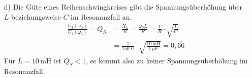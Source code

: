 {\begin{itemize}
    Die zugehörigen Werte sind:\\
    \begin{tabular}{cccccccc}
    \toprule
        $\omega$ & $0$ & $100\,\mathrm{s}^{-1}$ & $2000\,\mathrm{s}^{-1}$ & $3500\,\mathrm{s}^{-1}$ & $\omega_0$ & $10000\,\mathrm{s}^{-1}$ & $\omega\to\infty$\\
    \midrule
        $A(\omega)$ & $1,000$ & $1,009$ & $1,033$ & $1,087$ & $0,943$ & $0,555$ & $0$ \\
    \bottomrule
    \end{tabular}
    \item[d)] Die Güte eines Reihenschwingkreises gibt die Spannungsüberhöhung über $L$ beziehungsweise $C$
    im Resonanzfall an.
    \begin{align*}
        \frac{U_2(\omega_0)}{U_1(\omega_0)} = Q_S &= \frac{X_k}{R} = \frac{\omega_0 L}{R} = \frac{1}{R}\cdot\sqrt{\frac{L}{C}}\\
        &= \frac{1}{150\,\Omega}\cdot\sqrt{\frac{10\,\mathrm{mH}}{1\,\mu\mathrm{F}}}= 0,\overline{66} %
    \end{align*}
    Für $L=10\,\mathrm{mH}$ ist $Q_S < 1$, es kommt also zu keiner Spannungsüberhöhung im Resonanzfall.
\end{itemize}
}


